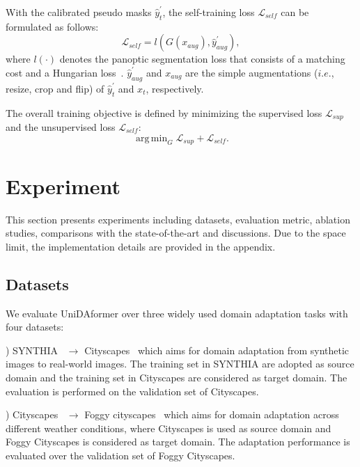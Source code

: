 \documentclass[10pt,twocolumn,letterpaper]{article}
\DeclareMathOperator*{\argmin}{arg\,min}
\begin{document}
With the calibrated pseudo masks $\hat{y}_t^{\prime}$, the self-training loss $\mathcal{L}_{self}$ can be formulated as follows:
\begin{equation}
\label{eq9}
\mathcal{L}_{self} = l(G(x_{aug}), \hat{y}_{aug}^{\prime}),
\end{equation}
where $l(\cdot)$ denotes the panoptic segmentation loss that consists of a matching cost
and a Hungarian loss~\cite{carion2020detr}. $\hat{y}_{aug}^{\prime}$ and $x_{aug}$ are the simple augmentations ($i.e.$, resize, crop and flip) of $\hat{y}_t^{\prime}$ and $x_t$, respectively.

The overall training objective is defined by minimizing the supervised loss $\mathcal{L}_{sup}$ and the unsupervised loss $\mathcal{L}_{self}$:
\begin{equation}
\label{eq10}
\argmin_G \mathcal{L}_{sup} + \mathcal{L}_{self}.
\end{equation}



\section{Experiment}
This section presents experiments including datasets, evaluation metric, ablation studies, comparisons with the state-of-the-art and discussions. 
Due to the space limit, the implementation details are provided in the appendix.

\subsection{Datasets}
\label{sec:details}
We evaluate UniDAformer over three widely used domain adaptation tasks with four datasets:

) SYNTHIA~\cite{ros2016synthia} $\rightarrow$ Cityscapes~\cite{cordts2016cityscapes} which aims for domain adaptation from synthetic images to real-world images. The training set in SYNTHIA are adopted as source domain and the training set in Cityscapes are considered as target domain. The evaluation is performed on the validation set of Cityscapes. 

) Cityscapes~\cite{cordts2016cityscapes} $\rightarrow$ Foggy cityscapes~\cite{sakaridis2018foggy} which aims for domain adaptation across different weather conditions, where Cityscapes is used as source domain and Foggy Cityscapes is considered as target domain. 
The adaptation performance is evaluated over the validation set of Foggy Cityscapes.
\end{document}
